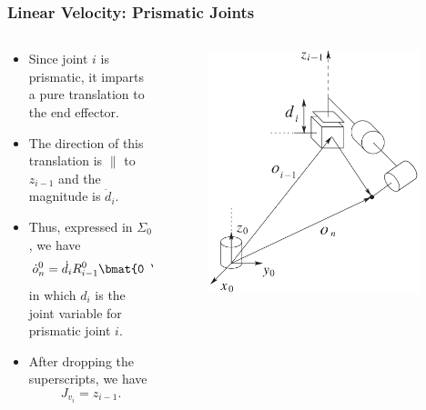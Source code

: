 \begin{frame}
    \frametitle{Linear Velocity: Prismatic Joints}

    \begin{columns}
        \begin{column}{0.6\textwidth}
            \begin{itemize}
                \item Since joint $i$ is prismatic, it imparts a pure translation 
                to the end effector.
                \item The direction of this translation is $\parallel$ to
                $z_{i-1}$ and the magnitude is $\dot{d}_i$.
                \item Thus, expressed in $\Sigma_0$, we have
                \[ \dot{o}_n^0 = \dot{d}_iR_{i-1}^0\bmat{0 \\ 0 \\ 1} = \dot{d}_iz_{i-1}^0, \]
                in which $d_i$ is the joint variable for prismatic joint $i$.
                \item After dropping the superscripts, we have \[ J_{v_i} =
                z_{i-1}. \]
            \end{itemize}
        \end{column}
        \begin{column}{0.4\textwidth}
            \begin{figure}[bth]
                \centering
                \includegraphics[width=0.95\textwidth]{figures/motion_due_to_prismatic.png} 

\end{figure}
\end{column}
\end{columns}
\end{frame}
